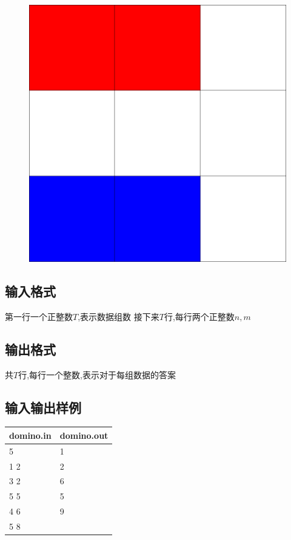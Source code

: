 \documentclass[12pt]{ctexart}
\begin{document}
\begin{figure}[htbp]
\begin{minipage}[t]{0.3\textwidth}
		\caption{}
	\end{minipage}
	\begin{minipage}[t]{0.3\textwidth}
		\centering
		\includegraphics{pictures/1-3.png}
		\caption{}
	\end{minipage}
\end{figure}

\subsection{输入格式}
第一行一个正整数$T$,表示数据组数
接下来$T$行,每行两个正整数$n,m$
\subsection{输出格式}
共$T$行,每行一个整数,表示对于每组数据的答案
\subsection{输入输出样例}
\begin{center}
	\begin{tabular}{|p{6cm}|p{6cm}|}
		\hline domino.in&domino.out\\
		\hline	5&1\\
				1 2&2\\
				3 2&6\\
				5 5&5\\
				4 6&9\\
				5 8&\\
		\hline
	\end{tabular}
\end{center}
\end{document}
